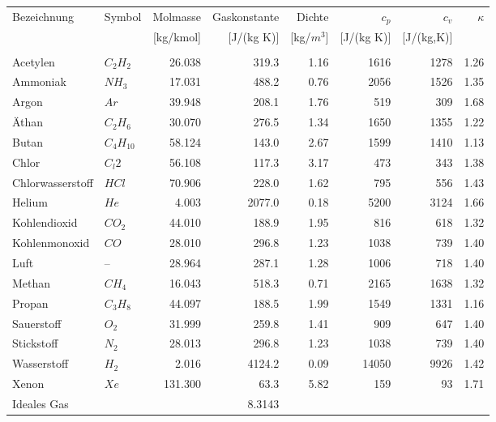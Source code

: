 \documentclass[twocolumn]{article}
\begin{document}
\begin{center}

\begin{tabular}{l|l|r|r|r|r|r|r}
Bezeichnung	&	Symbol	&Molmasse 	&Gaskonstante	&	Dichte	& $c_p$ & $c_v$ &$\kappa$ \\
		&		&[kg/kmol]	&[J/(kg K)]	& 	[kg/$m^3$]	& [J/(kg K)]	& [J/(kg,K)] & \\
	&&&&&&\\
Acetylen	&$	C_2H_2	$&	26.038	&	319.3	&	1.16 	&	1616	&	1278	&	1.26 \\
Ammoniak	&$	NH_3	$&	17.031	&	488.2	&	0.76 	&	2056	&	1526	&	1.35 \\
Argon		&$	Ar	$&	39.948	&	208.1	&	1.76 	&	519	&	309	&	1.68 \\
Äthan		&$	C_2H_6	$&	30.070	&	276.5	&	1.34 	&	1650	&	1355	&	1.22 \\
Butan		&$	C_4H_10	$&	58.124	&	143.0	&	2.67 	&	1599	&	1410	&	1.13 \\
Chlor		&$	C_l2	$&	56.108	&	117.3	&	3.17 	&	473	&	343	&	1.38 \\
Chlorwasserstoff&$	HCl	$&	70.906	&	228.0	&	1.62 	&	795	&	556	&	1.43 \\
Helium		&$	He	$&	4.003	&	2077.0	&	0.18 	&	5200	&	3124	&	1.66 \\
Kohlendioxid	&$	CO_2	$&	44.010	&	188.9	&	1.95 	&	816	&	618	&	1.32 \\
Kohlenmonoxid	&$	CO	$&	28.010	&	296.8	&	1.23 	&	1038	&	739	&	1.40 \\
Luft		&$	–	$&	28.964	&	287.1	&	1.28 	&	1006	&	718	&	1.40 \\
Methan		&$	CH_4	$&	16.043	&	518.3	&	0.71 	&	2165	&	1638	&	1.32 \\
Propan		&$	C_3H_8	$&	44.097	&	188.5	&	1.99 	&	1549	&	1331	&	1.16 \\
Sauerstoff	&$	O_2	$&	31.999	&	259.8	&	1.41 	&	909	&	647	&	1.40 \\
Stickstoff	&$	N_2	$&	28.013	&	296.8	&	1.23 	&	1038	&	739	&	1.40 \\
Wasserstoff	&$	H_2	$&	2.016	&	4124.2	&	0.09 	&	14050	&	9926	&	1.42 \\
Xenon		&$	Xe	$&	131.300	&	63.3	&	5.82 	&	159	&	93	&	1.71 \\
Ideales Gas	&		 &		&	8.3143	&		&		&
\end{tabular}

\end{center}
%										                                  
%
\end{document}
